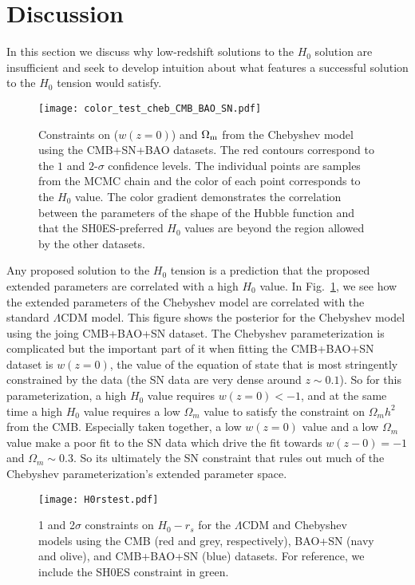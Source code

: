 \documentclass[
 reprint,
 amsmath,amssymb,
 aps,
]{revtex4-2}
\begin{document}
\section{Discussion}

In this section we discuss why low-redshift solutions to the $H_0$ solution are insufficient and seek to develop intuition about what features a successful solution to the $H_0$ tension would satisfy. 

\begin{figure}
    \centering
    \texttt{[image: color\_test\_cheb\_CMB\_BAO\_SN.pdf]}
    \caption{Constraints on ($w(z=0)$) and $\Omega_{\rm m}$ from the Chebyshev model using the CMB+SN+BAO datasets. The red contours correspond to the $1$ and $2$-$\sigma$ confidence levels.  The individual points are samples from the MCMC chain and the color of each point corresponds to the $H_0$ value. The color gradient demonstrates the correlation between the parameters of the shape of the Hubble function and that the SH0ES-preferred $H_0$ values are beyond the region allowed by the other datasets.}
    \label{fig:correlations}
\end{figure}

Any proposed solution to the $H_0$ tension is a prediction that the proposed extended parameters are correlated with a high $H_0$ value.  In Fig.~\ref{fig:correlations}, we see how the extended parameters of the Chebyshev model are correlated with the standard $\Lambda$CDM model. This figure shows the posterior for the Chebyshev model using the joing CMB+BAO+SN dataset. The Chebyshev parameterization is complicated but the important part of it when fitting the CMB+BAO+SN dataset is $w(z=0)$, the value of the equation of state that is most stringently constrained by the data (the SN data are very dense around $z\sim 0.1$). So for this parameterization, a high $H_0$ value requires $w(z=0)<-1$, and at the same time a high $H_0$ value requires a low $\Omega_m$ value to satisfy the constraint on $\Omega_m h^2$ from the CMB.  Especially taken together, a low $w(z=0)$ value and a low $\Omega_m$ value make a poor fit to the SN data which drive the fit towards $w(z-0)=-1$ and $\Omega_m\sim0.3$. So its ultimately the SN constraint that rules out much of the Chebyshev parameterization's extended parameter space.




\begin{figure}
    \centering
    \texttt{[image: H0rstest.pdf]}
    \caption{1 and 2$\sigma$ constraints on $H_0-r_s$ for the $\Lambda$CDM and Chebyshev models using the CMB (red and grey, respectively), BAO+SN (navy and olive), and CMB+BAO+SN (blue) datasets. For reference, we include the SH0ES constraint in green.}
    \label{fig:H0rs}
\end{figure}
\end{document}
